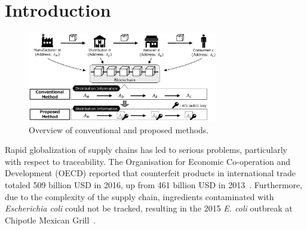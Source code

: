 \documentclass[conference]{IEEEtran}
\begin{document}
\section{Introduction}

\begin{figure}[b]
    \centering
    \includegraphics[width=0.74\textwidth]{outline.eps}
    \caption{Overview of conventional and proposed methods.
    \label{fig:outline}}
\end{figure}


Rapid globalization of supply chains has led to serious problems, particularly with respect to traceability.
The Organisation for Economic Co-operation and Development (OECD) reported that counterfeit products in international trade totaled 509 billion USD in 2016, up from 461 billion USD in 2013~\cite{OECD/EUIPO2019}.
Furthermore, due to the complexity of the supply chain, ingredients contaminated with \textit{Escherichia coli} could not be tracked, resulting in the 2015 \textit{E. coli} outbreak at Chipotle Mexican Grill~\cite{chipotle}.
\end{document}
